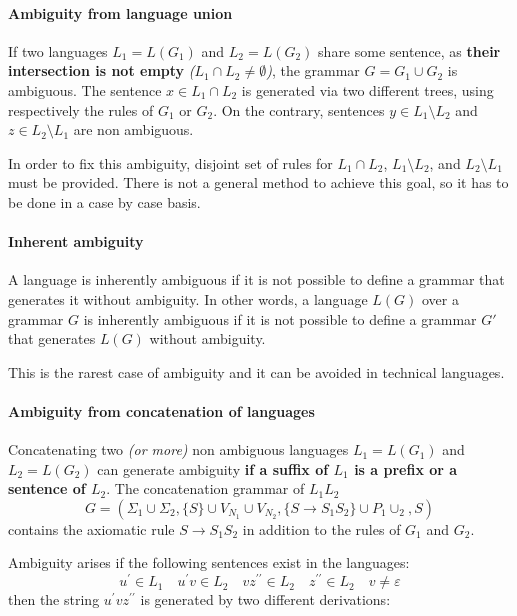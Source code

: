 \documentclass[english]{article}
\begin{document}
\paragraph{Ambiguity from language union}

If two languages \(L_1 = L(G_1)\) and \(L_2 = L(G_2)\) share some sentence, as \textbf{their intersection is not empty} \textit{(\(L_1 \cap L_2 \neq \emptyset\))}, the grammar \(G = G_1 \cup G_2\) is ambiguous.
The sentence \(x \in L_1 \cap L_2\) is generated via two different trees, using respectively the rules of \(G_1\) or \(G_2\).
On the contrary, sentences \(y \in L_1 \setminus L_2\) and \(z \in L_2 \setminus L_1\) are non ambiguous.

In order to fix this ambiguity, disjoint set of rules for \(L_1 \cap L_2\), \(L_1 \setminus L_2\), and \(L_2 \setminus L_1\) must be provided.
There is not a general method to achieve this goal, so it has to be done in a case by case basis.

\paragraph{Inherent ambiguity}

A language is inherently ambiguous if it is not possible to define a grammar that generates it without ambiguity.
In other words, a language \(L(G)\) over a grammar \(G\) is inherently ambiguous if it is not possible to define a grammar \(G'\) that generates \(L(G)\) without ambiguity.

This is the rarest case of ambiguity and it can be avoided in technical languages.

\paragraph{Ambiguity from concatenation of languages}

Concatenating two \textit{(or more)} non ambiguous languages \(L_1 = L(G_1)\) and \(L_2 = L(G_2)\) can generate ambiguity \textbf{if a suffix of \(L_1\) is a prefix or a sentence of \(L_2\)}.
The concatenation grammar  of \(L_1 L_2\)
\[G = \left(\Sigma_1 \cup \Sigma_2, \{S\} \cup V_{N_1} \cup V_{N_2}, \{S \rightarrow S_1 S_2\} \cup P_1 \cup _2, S\right)\]
contains the axiomatic rule \(S \rightarrow S_1 S_2\) in addition to the rules of \(G_1\) and \(G_2\).

Ambiguity arises if the following sentences exist in the languages:
\[ u^\prime \in L_1 \quad u^\prime v \in L_2 \quad v z^{\prime \prime} \in L_2 \quad z^{\prime \prime} \in L_2 \quad v \neq \varepsilon \]
then the string \(u^\prime v z^{\prime \prime}\) is generated by two different derivations:
\end{document}
